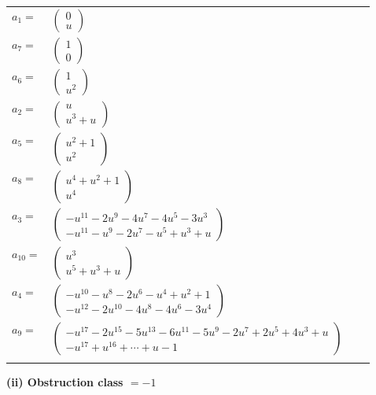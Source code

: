 \documentclass[1p]{elsarticle_modified}
\theoremstyle{definition}
\begin{document}
\begin{tabular}{m{7pt} m{180pt} m{7pt} m{180pt} }
\flushright $a_{1}=$&$\begin{pmatrix}0\\u\end{pmatrix}$ \\
\flushright $a_{7}=$&$\begin{pmatrix}1\\0\end{pmatrix}$ \\
\flushright $a_{6}=$&$\begin{pmatrix}1\\u^2\end{pmatrix}$ \\
\flushright $a_{2}=$&$\begin{pmatrix}u\\u^3+u\end{pmatrix}$ \\
\flushright $a_{5}=$&$\begin{pmatrix}u^2+1\\u^2\end{pmatrix}$ \\
\flushright $a_{8}=$&$\begin{pmatrix}u^4+u^2+1\\u^4\end{pmatrix}$ \\
\flushright $a_{3}=$&$\begin{pmatrix}- u^{11}-2 u^9-4 u^7-4 u^5-3 u^3\\- u^{11}- u^9-2 u^7- u^5+u^3+u\end{pmatrix}$ \\
\flushright $a_{10}=$&$\begin{pmatrix}u^3\\u^5+u^3+u\end{pmatrix}$ \\
\flushright $a_{4}=$&$\begin{pmatrix}- u^{10}- u^8-2 u^6- u^4+u^2+1\\- u^{12}-2 u^{10}-4 u^8-4 u^6-3 u^4\end{pmatrix}$ \\
\flushright $a_{9}=$&$\begin{pmatrix}- u^{17}-2 u^{15}-5 u^{13}-6 u^{11}-5 u^9-2 u^7+2 u^5+4 u^3+u\\- u^{17}+u^{16}+\cdots+u-1\end{pmatrix}$\\&\end{tabular}
\flushleft \textbf{(ii) Obstruction class $= -1$}\\~\\
\end{document}
